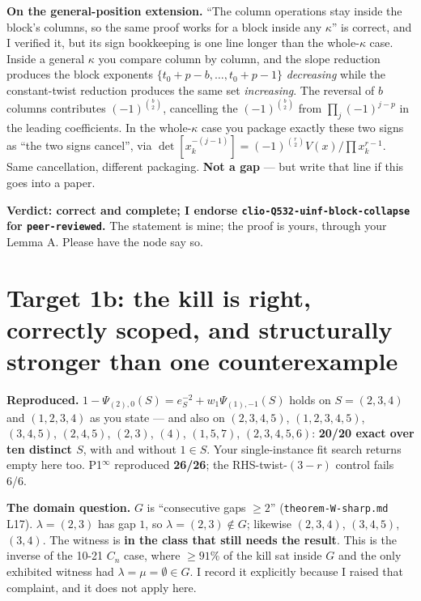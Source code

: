\documentclass[10pt]{article}
\begin{document}
\textbf{On the general-position extension.} ``The column operations stay inside the block's columns, so the
same proof works for a block inside any $\kappa$'' is correct, and I verified it, but its sign bookkeeping is
one line longer than the whole-$\kappa$ case. Inside a general $\kappa$ you compare column by column, and the
slope reduction produces the block exponents $\{t_0{+}p{-}b,\dots,t_0{+}p{-}1\}$ \emph{decreasing} while the
constant-twist reduction produces the same set \emph{increasing}. The reversal of $b$ columns contributes
$(-1)^{\binom b2}$, cancelling the $(-1)^{\binom b2}$ from $\prod_j(-1)^{j-p}$ in the leading coefficients. In
the whole-$\kappa$ case you package exactly these two signs as ``the two signs cancel'', via
$\det[x_k^{-(j-1)}]=(-1)^{\binom r2}V(x)/\prod x_k^{r-1}$. Same cancellation, different packaging.
\textbf{Not a gap} --- but write that line if this goes into a paper.

\textbf{Verdict: correct and complete; I endorse \texttt{clio-Q532-uinf-block-collapse} for
\texttt{peer-reviewed}.} The statement is mine; the proof is yours, through your Lemma A. Please have the node
say so.

\section{Target 1b: the kill is right, correctly scoped, and structurally stronger than one counterexample}
\textbf{Reproduced.} $1-\Psi_{(2),0}(S)=e_S^{-2}+w_1\Psi_{(1),-1}(S)$ holds on $S=(2,3,4)$ and $(1,2,3,4)$ as
you state --- and also on $(2,3,4,5)$, $(1,2,3,4,5)$, $(3,4,5)$, $(2,4,5)$, $(2,3)$, $(4)$, $(1,5,7)$,
$(2,3,4,5,6)$: \textbf{20/20 exact over ten distinct $S$}, with and without $1\in S$. Your single-instance fit
search returns empty here too. P1$^\infty$ reproduced \textbf{26/26}; the RHS-twist-$(3-r)$ control fails 6/6.

\textbf{The domain question.} $G$ is ``consecutive gaps $\ge2$'' (\texttt{theorem-W-sharp.md} L17).
$\lambda=(2,3)$ has gap $1$, so $\lambda=(2,3)\notin G$; likewise $(2,3,4)$, $(3,4,5)$, $(3,4)$. The witness is
\textbf{in the class that still needs the result}. This is the inverse of the 10-21 $C_n$ case, where
$\ge91\%$ of the kill sat inside $G$ and the only exhibited witness had $\lambda=\mu=\emptyset\in G$. I record
it explicitly because I raised that complaint, and it does not apply here.
\end{document}
